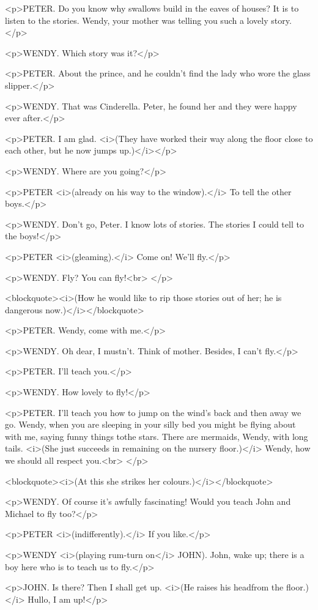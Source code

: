 <p>PETER. Do you know why swallows build in the eaves of houses? It
is to listen to the stories. Wendy, your mother was telling you such
a lovely story.</p>

<p>WENDY. Which story was it?</p>

<p>PETER. About the prince, and he couldn't find the lady who wore
the glass slipper.</p>

<p>WENDY. That was Cinderella. Peter, he found her and they were
happy ever after.</p>

<p>PETER. I am glad. <i>(They have worked their way along the floor
close to each other, but he now jumps up.)</i></p>

<p>WENDY. Where are you going?</p>

<p>PETER <i>(already on his way to the window).</i> To tell the other
boys.</p>

<p>WENDY. Don't go, Peter. I know lots of stories. The stories I
could tell to the boys!</p>

<p>PETER <i>(gleaming).</i> Come on! We'll fly.</p>

<p>WENDY. Fly? You can fly!<br>
</p>

<blockquote><i>(How he would like to rip those stories out of her; he
is dangerous now.)</i></blockquote>

<p>PETER. Wendy, come with me.</p>

<p>WENDY. Oh dear, I mustn't. Think of mother. Besides, I can't
fly.</p>

<p>PETER. I'll teach you.</p>

<p>WENDY. How lovely to fly!</p>

<p>PETER. I'll teach you how to jump on the wind's back and then away
we go. Wendy, when you are sleeping in your silly bed you might be
flying about with me, saying funny things tothe stars. There are
mermaids, Wendy, with long tails. <i>(She just succeeds in remaining
on the nursery floor.)</i> Wendy, how we should all respect you.<br>
</p>

<blockquote><i>(At this she strikes her colours.)</i></blockquote>

<p>WENDY. Of course it's awfully fascinating! Would you teach John
and Michael to fly too?</p>

<p>PETER <i>(indifferently).</i> If you like.</p>

<p>WENDY <i>(playing rum-turn on</i> JOHN). John, wake up; there is a
boy here who is to teach us to fly.</p>

<p>JOHN. Is there? Then I shall get up. <i>(He raises his headfrom
the floor.)</i> Hullo, I am up!</p>

